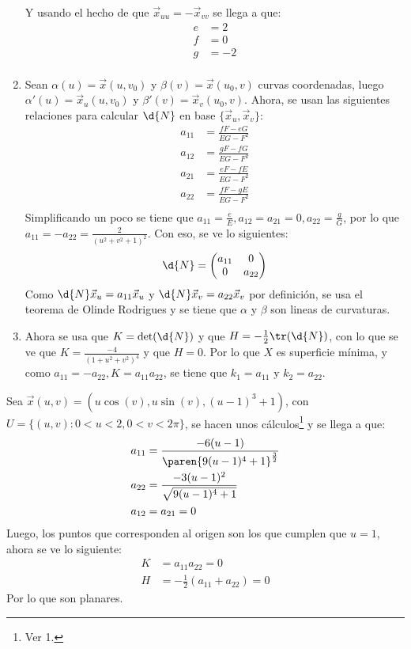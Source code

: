 \documentclass{homework}
\begin{document}
\begin{sol}[1]
\begin{enumerate}
        Y usando el hecho de que \(\vec{x}_{uu}=-\vec{x}_{vv}\) se llega a que:
        \begin{align*}
            e&=2\\
            f&=0\\
            g&=-2\\
        \end{align*}
        \item Sean \(\alpha(u)=\vec{x}(u,v_0)\) y \(\beta(v)=\vec{x}(u_0,v)\) curvas coordenadas, luego \(\alpha'(u)=\vec{x}_u(u,v_0)\) y \(\beta'(v)=\vec{x}_v(u_0,v)\). Ahora, se usan las siguientes relaciones para calcular \(\d{N}\) en base \(\{\vec{x}_u,\vec{x}_v\}\):
        \begin{align*}
            a_{11}&=\frac{fF-eG}{EG-F^2}\\
            a_{12}&=\frac{gF-fG}{EG-F^2}\\
            a_{21}&=\frac{eF-fE}{EG-F^2}\\
            a_{22}&=\frac{fF-gE}{EG-F^2}\\
        \end{align*}
        Simplificando un poco se tiene que \(a_{11}=\frac{e}{E},a_{12}=a_{21}=0,a_{22}=\frac{g}{G}\), por lo que \(a_{11}=-a_{22}=\frac2{(u^2+v^2+1)^2}\). Con eso, se ve lo siguientes:
        \begin{equation*}
            \d{N}=\begin{pmatrix}
                a_{11}&0\\
                0&a_{22}
            \end{pmatrix}
        \end{equation*}
        Como \(\d{N}\vec{x}_u=a_{11}\vec{x}_u\) y \(\d{N}\vec{x}_v=a_{22}\vec{x}_v\) por definición, se usa el teorema de Olinde Rodrigues y se tiene que \(\alpha\) y \(\beta\) son lineas de curvaturas.
        \item Ahora se usa que \(K=\det(\d{N})\) y que \(H=-\frac12\tr(\d{N})\), con lo que se ve que \(K=\frac{-4}{(1+u^2+v^2)^4}\) y que \(H=0\). Por lo que \(X\) es superficie mínima, y como \(a_{11}=-a_{22}, K=a_{11}a_{22}\), se tiene que \(k_1=a_{11}\) y \(k_2=a_{22}\).
    \end{enumerate}
\end{sol}

\begin{sol}[2]
    Sea \(\vec{x}(u,v)=(u\cos(v),u\sin(v),(u-1)^3+1)\), con \(U=\{(u,v):0<u<2,0<v<2\pi\}\), se hacen unos cálculos\footnote{Ver 1.} y se llega a que:
    \begin{align*}
        a_{11}&=\frac{-6(u-1)}{\paren{9(u-1)^4+1}^{\frac32}}\\
        a_{22}&=\frac{-3(u-1)^2}{\sqrt{9(u-1)^4+1}}\\
        a_{12}&=a_{21}=0
    \end{align*}
    Luego, los puntos que corresponden al origen son los que cumplen que \(u=1\), ahora se ve lo siguiente:
    \begin{align*}
        K&=a_{11}a_{22}=0\\
        H&=-\frac12(a_{11}+a_{22})=0
    \end{align*}
    Por lo que son planares.
\end{sol}
\end{document}
